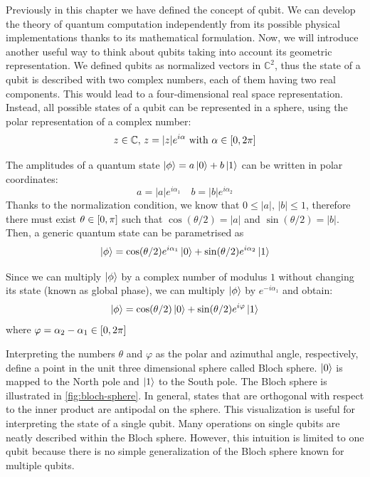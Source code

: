 \vspace{5pt}
Previously in this chapter we have defined the concept of qubit. We can develop the theory of quantum computation independently from its possible physical implementations thanks to its mathematical formulation. Now, we will introduce another useful way to think about qubits taking into account its geometric representation. We defined qubits as normalized vectors in $\mathbb{C}^2$, thus the state of a qubit is described with two complex numbers, each of them having two real components. This would lead to a four-dimensional real space representation. Instead, all possible states of a qubit can be represented in a sphere, using the polar representation of a complex number:
\begin{equation}
    z \in \mathbb{C},\, z=|z| e^{i \alpha} \text{ with } \alpha \in \interval{0}{2\pi}
\end{equation}

The amplitudes of a quantum state $\ket{\phi} = a \ket{0} + b \ket{1}$ can be written in polar coordinates: $$a = |a| e^{i\alpha_1} \quad b = |b| e^{i \alpha_2}$$
Thanks to the normalization condition, we know that $0\le |a|,\,|b| \le 1$, therefore there must exist $\theta \in \interval{0}{\pi}$ such that $\cos(\theta /2) = |a|$ and $\sin(\theta/2)=|b|$. Then, a generic quantum state can be parametrised as
$$\ket{\phi} = \cos(\theta /2) e^{i \alpha_1} \ket{0} + \sin(\theta/2)e^{i \alpha_2} \ket{1} $$

Since we can multiply $ \ket{\phi}$ by a complex number of modulus $1$ without changing its state (known as global phase), we can multiply $\ket{\phi}$ by $e^{-i\alpha_1}$ and obtain:
$$\ket{\phi} = \cos(\theta /2) \ket{0} + \sin(\theta/2)e^{i \varphi} \ket{1} $$
where $\varphi = \alpha_2-\alpha_1 \in \interval{0}{2\pi}$

Interpreting the numbers $\theta$ and $\varphi$ as the polar and azimuthal angle, respectively, define a point in the unit three dimensional sphere called Bloch sphere. $\ket{0}$ is mapped to the North pole and $\ket{1}$ to the South pole. The Bloch sphere is illustrated in \autoref{fig:bloch-sphere}. In general, states that are orthogonal with respect to the inner product are antipodal on the sphere. This visualization is useful for interpreting the state of a single qubit. Many operations on single qubits are neatly described within the Bloch sphere. However, this intuition is limited to one qubit because there is no simple generalization of the Bloch sphere known for multiple qubits.


